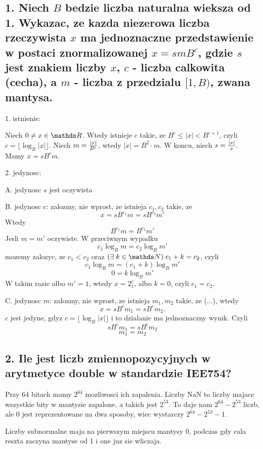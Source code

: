 \documentclass{article}[13pt]
\begin{document}
    \subsection*{1. Niech $B$ bedzie liczba naturalna wieksza od 1. Wykazac, ze kazda niezerowa liczba rzeczywista $x$ ma jednoznaczne przedstawienie w postaci znormalizowanej $x=smB^c$, gdzie $s$ jest znakiem liczby $x$, $c$ - liczba calkowita (cecha), a $m$ - liczba z przedzialu $[1, B)$, zwana mantysa.}

    1. istnienie:
    \medskip

    Niech $0\neq x\in\R$. Wtedy istnieje $c$ takie, ze $B^c\leq |x| < B^{c+1}$, czyli $c=\lfloor\log_B |x|\rfloor$. Niech $m={|x|\over B^c}$, wtedy $|x|=B^2\cdot m$. W koncu, niech $s={|x|\over x}$. Mamy $x=sB^cm$.
    \bigskip

    2. jedynosc:
    \medskip

    \indent A. jedynosc $s$ jest oczywista
    \medskip

    \indent B. jedynosc $c$: zalozmy, nie wprost, ze istnieja $c_1, c_2$ takie, ze
    $$x=sB^{c_1}m=sB^{c_2}m'$$
    Wtedy
    $$B^{c_1}m=B^{c_2}m'$$
    Jesli $m=m'$ oczywiste. W przeciwnym wypadku
    $$c_1\log_B m=c_2\log_B m'$$
    mozemy zalozyc, ze $c_1<c_2$ oraz $(\exists\;k\in\N)\;c_1+k=c_2$, czyli
    $$c_1\log_B m=(c_1+k)\log_B m'$$
    $$0 = k\log_B m'$$
    W takim razie albo $m'=1$, wtedy $x=2^c_1$, albo $k=0$, czyli $c_1=c_2$.
    \medskip

    \indent C. jedynosc $m$: zalozmy, nie wprost, ze istnieja $m_1, m_2$ takie, ze (...), wtedy
    $$x=sB^{c}m_1=sB^{c}m_2.$$
    $c$ jest jedyne, gdyz $c=\lfloor \log_B|x|\rfloor$ i to dzialanie ma jednoznaczny wynik. Czyli
    $$sB^cm_1=sB^cm_2$$
    $$m_1=m_2$$

    \kdowod

    \subsection*{2. Ile jest liczb zmiennopozycyjnych w arytmetyce double w standardzie IEE754?}

    Przy 64 bitach mamy $2^{64}$ mozliwosci ich zapalenia. Liczby NaN to liczby majace wszystkie bity w mantysie zapalone, a takich jest $2^{53}$. To daje nam $2^{64}-2^{53}$ liczb, ale 0 jest reprezentowane na dwa sposoby, wiec wystarczy $2^{64}-2^{53}-1$. 
    
    Liczby subnormalne maja na pierwszym miejscu mantysy 0, podczas gdy cala reszta zaczyna mantyse od 1 i one juz sie wliczaja.
\end{document}
